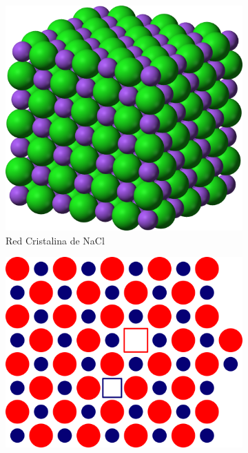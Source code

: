 \documentclass[a4paper,11pt]{article}
\begin{document}
\begin{figure}[t]
    \centering
    \begin{subfigure}[b]{0.3\textwidth}
        \includegraphics[width=\textwidth]{figs/NaCl.png}
        \caption{Red Cristalina de NaCl}
        \label{fig:nacl}
    \end{subfigure}
    \begin{subfigure}[b]{0.3\textwidth}
        \includegraphics[width=\textwidth]{figs/schottky.png}

\end{subfigure}
\end{figure}
\end{document}
